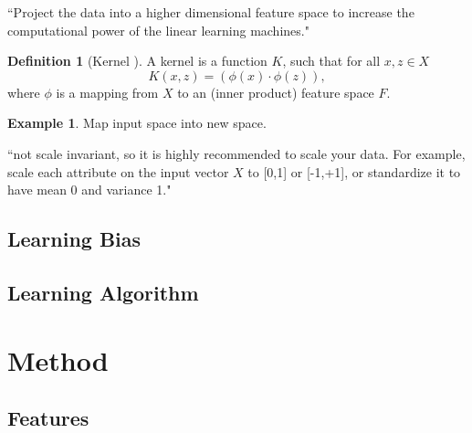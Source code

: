 \documentclass[12pt, titlepage]{amsart}
\theoremstyle{definition}
\newtheorem{definition}{Definition}[subsection]
\newtheorem{example}{Example}[subsection]
\begin{document}
	``Project the data into a higher dimensional feature space to increase the computational power of the linear learning machines." \cite{christianini}
	
	\begin{definition}[Kernel \cite{christianini}]\label{definition:kernel}
		A kernel is a function $K$, such that for all $x, z \in X$
		$$ K(x,z) = (\phi(x) \cdot \phi(z)),$$
		where $\phi$ is a mapping from $X$ to an (inner product) feature space $F$. 
	\end{definition}
	
	\begin{example}
		Map input space into new space.
	\end{example}
	
	``not scale invariant, so it is highly recommended to scale your data. For example, scale each attribute on the input vector $X$ to [0,1] or [-1,+1], or standardize it to have mean 0 and variance 1."
	
	
	
	
	
	\subsection{Learning Bias} %
	
	\subsection{Learning Algorithm} %
	
	
	
		
	\section{Method}\label{method}
		
	\subsection{Features}
	
\end{document}
